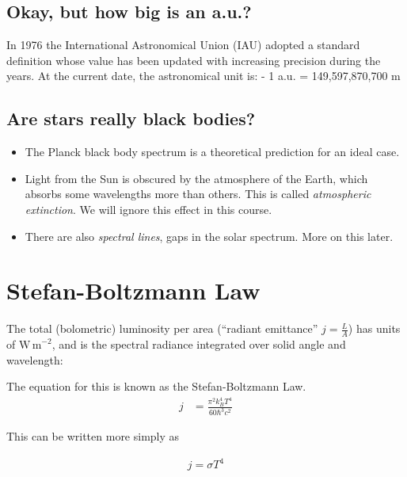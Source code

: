 \documentclass[
  letterpaper,
  DIV=11,
  numbers=noendperiod]{scrreprt}
\providecommand{\tightlist}{%
  \setlength{\itemsep}{0pt}\setlength{\parskip}{0pt}}\usepackage{longtable,booktabs,array}
\begin{document}
\hypertarget{okay-but-how-big-is-an-a.u.}{%
\section{Okay, but how big is an
a.u.?}\label{okay-but-how-big-is-an-a.u.}}

In 1976 the International Astronomical Union (IAU) adopted a standard
definition whose value has been updated with increasing precision during
the years. At the current date, the astronomical unit is: - 1 a.u. =
149,597,870,700 m

\hypertarget{are-stars-really-black-bodies}{%
\section{Are stars really black
bodies?}\label{are-stars-really-black-bodies}}

\begin{itemize}
\tightlist
\item
  The Planck black body spectrum is a theoretical prediction for an
  ideal case.
\item
  Light from the Sun is obscured by the atmosphere of the Earth, which
  absorbs some wavelengths more than others. This is called
  \emph{atmospheric extinction}. We will ignore this effect in this
  course.
\item
  There are also \emph{spectral lines}, gaps in the solar spectrum. More
  on this later.
\end{itemize}


\hypertarget{stefan-boltzmann-law}{%
\chapter{Stefan-Boltzmann Law}\label{stefan-boltzmann-law}}

The total (bolometric) luminosity per area (``radiant emittance''
\(j=\frac{L}{A}\)) has units of \(\mathrm{W\,m}^{-2}\), and is the
spectral radiance integrated over solid angle and wavelength:

The equation for this is known as the Stefan-Boltzmann Law.
\begin{align}
j &= \frac{\pi^2 k_B^4 T^4}{60 \hbar^3 c^2}
\end{align}

This can be written more simply as

\begin{align}
j = \sigma T^4
\end{align}
\end{document}
